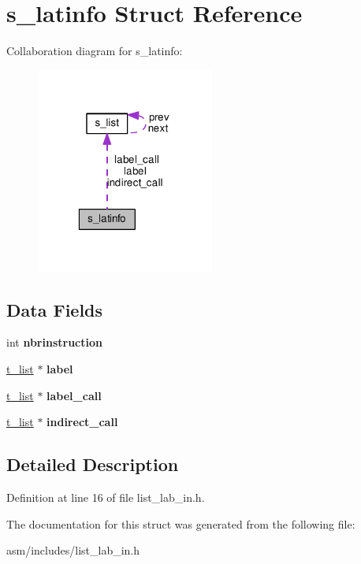 \hypertarget{structs__latinfo}{\section{s\-\_\-latinfo Struct Reference}
\label{structs__latinfo}
}


Collaboration diagram for s\-\_\-latinfo\-:
\nopagebreak
\begin{figure}[H]
\begin{center}
\leavevmode
\includegraphics[width=166pt]{structs__latinfo__coll__graph}
\end{center}
\end{figure}
\subsection*{Data Fields}
\begin{DoxyCompactItemize}
\item 
\hypertarget{structs__latinfo_a565ba05926f2219e68cf55a13f15fbab}{int {\bfseries nbrinstruction}}\label{structs__latinfo_a565ba05926f2219e68cf55a13f15fbab}

\item 
\hypertarget{structs__latinfo_a53b5fc61b57ec971b013fa338a3adfc7}{\hyperlink{structs__list}{t\-\_\-list} $\ast$ {\bfseries label}}\label{structs__latinfo_a53b5fc61b57ec971b013fa338a3adfc7}

\item 
\hypertarget{structs__latinfo_ab7161df38e24c00cc4f576cec776ea81}{\hyperlink{structs__list}{t\-\_\-list} $\ast$ {\bfseries label\-\_\-call}}\label{structs__latinfo_ab7161df38e24c00cc4f576cec776ea81}

\item 
\hypertarget{structs__latinfo_a2644eca4f289d61e8f2e5923cf5a3a6c}{\hyperlink{structs__list}{t\-\_\-list} $\ast$ {\bfseries indirect\-\_\-call}}\label{structs__latinfo_a2644eca4f289d61e8f2e5923cf5a3a6c}

\end{DoxyCompactItemize}


\subsection{Detailed Description}


Definition at line 16 of file list\-\_\-lab\-\_\-in.\-h.



The documentation for this struct was generated from the following file\-:\begin{DoxyCompactItemize}
\item 
asm/includes/list\-\_\-lab\-\_\-in.\-h\end{DoxyCompactItemize}
